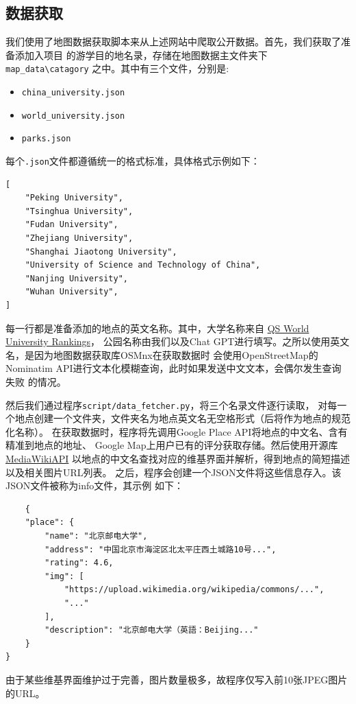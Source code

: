 \documentclass{report}
\begin{document}
\subsection{数据获取}
我们使用了地图数据获取脚本来从上述网站中爬取公开数据。首先，我们获取了准备添加入项目
的游学目的地名录，存储在地图数据主文件夹下\verb|map_data\catagory|
之中。其中有三个文件，分别是:
\begin{itemize}
    \item \verb|china_university.json|
    \item \verb|world_university.json|
    \item \verb|parks.json|
\end{itemize}
每个\verb|.json|文件都遵循统一的格式标准，具体格式示例如下：

\begin{verbatim}
[
    "Peking University",
    "Tsinghua University",
    "Fudan University",
    "Zhejiang University",
    "Shanghai Jiaotong University",
    "University of Science and Technology of China",
    "Nanjing University",
    "Wuhan University",
]
\end{verbatim}
每一行都是准备添加的地点的英文名称。其中，大学名称来自
\href{https://www.topuniversities.com/qs-world-university-rankings}{QS World University Rankings}，
公园名称由我们以及Chat GPT进行填写。之所以使用英文名，是因为地图数据获取库OSMnx在获取数据时
会使用OpenStreetMap的Nominatim API进行文本化模糊查询，此时如果发送中文文本，会偶尔发生查询失败
的情况。
\par
然后我们通过程序\verb|script/data_fetcher.py|，将三个名录文件逐行读取，
对每一个地点创建一个文件夹，文件夹名为地点英文名无空格形式（后将作为地点的规范化名称）。
在获取数据时，程序将先调用Google Place API将地点的中文名、含有精准到地点的地址、
Google Map上用户已有的评分获取存储。然后使用开源库
\href{https://github.com/lehinevych/MediaWikiAPI}{MediaWikiAPI}
以地点的中文名查找对应的维基界面并解析，得到地点的简短描述以及相关图片URL列表。
之后，程序会创建一个JSON文件将这些信息存入。该JSON文件被称为info文件，其示例
如下：
\begin{verbatim}
    {
    "place": {
        "name": "北京邮电大学",
        "address": "中国北京市海淀区北太平庄西土城路10号...",
        "rating": 4.6,
        "img": [
            "https://upload.wikimedia.org/wikipedia/commons/...",
            "..."
        ],
        "description": "北京邮电大学（英語：Beijing..."
    }
}
\end{verbatim}
由于某些维基界面维护过于完善，图片数量极多，故程序仅写入前10张JPEG图片的URL。
\par
\end{document}
